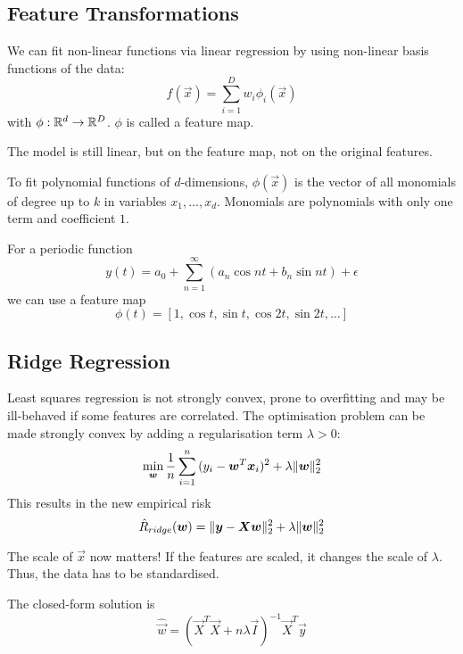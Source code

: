 \subsection{Feature Transformations}
We can fit non-linear functions via linear regression
by using non-linear basis functions of the data:
\begin{equation*}
f(\vec{x}) = \sum_{i=1}^D{w_i \phi_i(\vec{x})}
\end{equation*}
with $\phi : \mathbb{R}^d \to \mathbb{R}^D$.
$\phi$ is called a feature map.

The model is still linear,
but on the feature map,
not on the original features.

To fit polynomial functions of $d$-dimensions,
$\phi(\vec{x})$ is the vector of all monomials of degree
up to $k$ in variables $x_1, \dotsc, x_d$.
Monomials are polynomials with only one term and coefficient $1$.

For a periodic function
\begin{equation*}
y(t) = a_0 +
\sum_{n=1}^\infty{(a_n \cos{nt} + b_n \sin{nt})} + \epsilon
\end{equation*}
we can use a feature map
\begin{equation*}
\phi(t) = [1, \cos{t}, \sin{t}, \cos{2t}, \sin{2t}, \dotsc]
\end{equation*}


\subsection{Ridge Regression}
Least squares regression is not strongly convex,
prone to overfitting and may be ill-behaved if
some features are correlated.
The optimisation problem can be made strongly convex by adding
a regularisation term $\lambda > 0$:
\begin{equation*}
\min_{\boldsymbol{w}}{\frac{1}{n}
	\sum_{i=1}^n{(y_i - \boldsymbol{w}^T \boldsymbol{x}_i)^2
		+ \lambda \lVert\boldsymbol{w}\rVert_2^2
}}
\end{equation*}
This results in the new empirical risk
\begin{equation*}
\hat{R}_{ridge}(\boldsymbol{w})
= \lVert\boldsymbol{y} - \boldsymbol{X}\boldsymbol{w}\rVert_2^2
+ \lambda \lVert\boldsymbol{w}\rVert_2^2
\end{equation*}

The scale of $\vec{x}$ now matters!
If the features are scaled, it changes the scale of $\lambda$.
Thus, the data has to be standardised.

The closed-form solution is
\begin{equation*}
\hat{\vec{w}} =
(\vec{X}^T \vec{X} + n \lambda \vec{I})^{-1} \vec{X}^T \vec{y}
\end{equation*}

